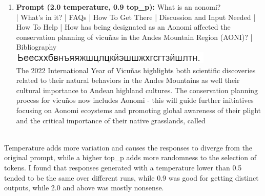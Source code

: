\documentclass[]{article}
\begin{document}
\begin{enumerate}
    \item \textbf{Prompt (2.0 temperature, 0.9 top\_p):} What is an aonomi? \\
    | What’s in it? | FAQs | How To Get There | Discussion and Input Needed | How To Help | How has being designated as an Aonomi affected the conservation planning of vicuñas in the Andes Mountain Region (AONI)? | Bibliography \\
    \includegraphics[scale=0.9]{aonomi img 1.png} \\
    The 2022 International Year of Vicuñas highlights both scientific discoveries related to their natural behaviors in the Andes Mountains as well their cultural importance to Andean highland cultures. The conservation planning process for vicuños now includes Aonomi - this will guide further initiatives focusing on Aonomi ecoystems and promoting global awareness of their plight and the critical importance of their native grasslands, called \\ \\
    
\end{enumerate}
Temperature adds more variation and causes the responses to diverge from the original prompt, while a higher top\_p adds more randomness to the selection of tokens. I found that responses generated with a temperature lower than 0.5 tended to be the same over different runs, while 0.9 was good for getting distinct outputs, while 2.0 and above was mostly nonsense.

\newpage
\end{document}
